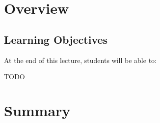\documentclass[paper=letter,twoside,fontsize=10pt,parskip=half,mpinclude=true]{scrartcl}
\title{\thislecture}
\subtitle{\course}
\author{Samuel W. Flint}
\date{\term}
\begin{document}
\maketitle

\section{Overview}
\label{sec:overview}

\subsection{Learning Objectives}
\label{sec:learning-objectives}

At the end of this lecture, students will be able to:

\begin{objectives}
\item \label{obj:todo} TODO
\end{objectives}



\section{Summary}
\label{sec:summary}


\printbibliography
\end{document}
